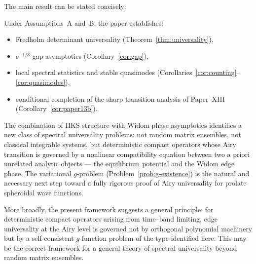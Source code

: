 \documentclass[12pt,a4paper]{amsart}
\theoremstyle{definition}
\theoremstyle{remark}
\begin{document}
The main result can be stated concisely:

\begin{center}
\end{center}

Under Assumptions~A and~B, the paper establishes:
\begin{itemize}
\item Fredholm determinant universality (Theorem~\ref{thm:universality}),
\item $c^{-1/3}$ gap asymptotics (Corollary~\ref{cor:gap}),
\item local spectral statistics and stable quasimodes
  (Corollaries~\ref{cor:counting}--\ref{cor:quasimodes}),
\item conditional completion of the sharp transition analysis of
  Paper~XIII (Corollary~\ref{cor:paper13b}).
\end{itemize}

The combination of IIKS structure with Widom phase asymptotics
identifies a new class of spectral universality problems: not
random matrix ensembles, not classical integrable systems, but
deterministic compact operators whose Airy transition is governed
by a nonlinear compatibility equation between two a priori
unrelated analytic objects --- the equilibrium potential and the
Widom edge phase.
The variational $g$-problem (Problem~\ref{prob:g-existence}) is
the natural and necessary next step toward a fully rigorous proof
of Airy universality for prolate spheroidal wave functions.

More broadly, the present framework suggests a general principle:
for deterministic compact operators arising from time--band
limiting, edge universality at the Airy level is governed not
by orthogonal polynomial machinery but by a self-consistent
$g$-function problem of the type identified here.
This may be the correct framework for a general theory of
spectral universality beyond random matrix ensembles.
\end{document}
